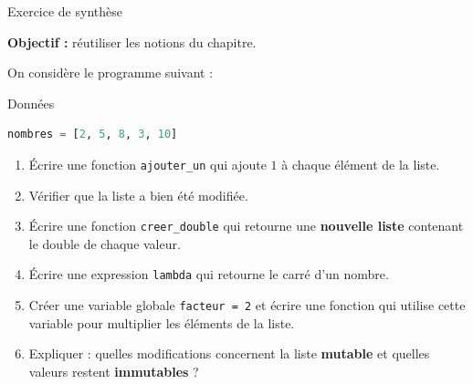 \documentclass[10pt, xcolor={svgnames}]{beamer}
\begin{document}
\begin{frame}[fragile]{Exercice de synthèse}
	
	\textbf{Objectif :} réutiliser les notions du chapitre.
	
	\vspace{0.3cm}
	
	On considère le programme suivant :
	
	\begin{exampleblock}{Données}
		\begin{lstlisting}[language=Python]
nombres = [2, 5, 8, 3, 10]
		\end{lstlisting}
	\end{exampleblock}
	
	\vspace{0.2cm}
	
	\begin{enumerate}
		\item Écrire une fonction \texttt{ajouter\_un} qui ajoute $1$
		à chaque élément de la liste.
		
		\item Vérifier que la liste a bien été modifiée.
		
		\item Écrire une fonction \texttt{creer\_double} qui retourne
		une \textbf{nouvelle liste} contenant le double de chaque valeur.
		
		\item Écrire une expression \texttt{lambda} qui retourne le carré
		d'un nombre.
		
		\item Créer une variable globale \texttt{facteur = 2} et écrire
		une fonction qui utilise cette variable pour multiplier
		les éléments de la liste.
		
		\item Expliquer : quelles modifications concernent la liste
		\textbf{mutable} et quelles valeurs restent \textbf{immutables} ?
	\end{enumerate}
	
\end{frame}
\end{document}
